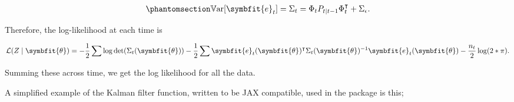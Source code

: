 \documentclass[
]{report}
\newcommand{\bv}[1]{\symbfit{#1}}
\theoremstyle{plain}
\theoremstyle{plain}
\theoremstyle{plain}
\theoremstyle{remark}
\begin{document}
\begin{equation}\phantomsection\label{eq-predvar}{\begin{split}
\mathbb V\mathrm{ar}[\bv e_t]=\Sigma_t= \Phi_{t} P_{t\mid t-1} \Phi_{t}^\intercal + \Sigma_\epsilon. 
\end{split}
}\end{equation}

Therefore, the log-likelihood at each time is

\[\begin{split}
\mathcal L(Z\mid\bv\theta) = -\frac12\sum \log\det(\Sigma_t(\bv\theta)) - \frac12 \sum\bv e_t(\bv\theta)^\intercal\Sigma_{t}(\bv\theta)^{-1} \bv e_t(\bv\theta) - \frac{n_{t}}{2}\log(2*\pi).
\end{split}
\]

Summing these across time, we get the log likelihood for all the data.

A simplified example of the Kalman filter function, written to be JAX
compatible, used in the package is this;

\newpage
\small
\end{document}
